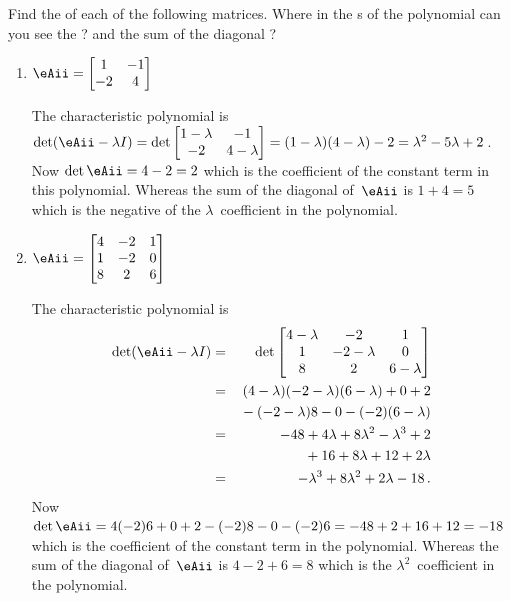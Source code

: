 \begin{example} \label{eg:}
Find the  of each of the following matrices.  
Where in the s of the polynomial can you see the ? and the sum of the diagonal ?
\begin{enumerate}
\item \(\eAii=\begin{bmatrix} 1&-1\\-2&4 \end{bmatrix}\)
\begin{solution} 
The characteristic polynomial is \(\det(\eAii-\lambda I)
=\det\begin{bmatrix} 1-\lambda&-1\\-2&4-\lambda \end{bmatrix}
=(1-\lambda)(4-\lambda)-2
=\lambda^2-5\lambda+2\)\,.
Now \(\det \eAii=4-2=2\) which is the coefficient of the constant term in this polynomial.
Whereas the sum of the diagonal of~\(\eAii\) is \(1+4=5\) which is the negative of the \(\lambda\)~coefficient in the polynomial.
\end{solution}

\item \(\eAii=\begin{bmatrix}4&-2&1
\\1&-2&0
\\8&2&6 \end{bmatrix}\)
\begin{solution} 
The characteristic polynomial is 
\begin{eqnarray*}
\det(\eAii-\lambda I)
&=&\det\begin{bmatrix} 4-\lambda&-2&1
\\1&-2-\lambda&0
\\8&2&6-\lambda \end{bmatrix}
\\&=&(4-\lambda)(-2-\lambda)(6-\lambda)+0+2
\\&&{}
-(-2-\lambda)8-0-(-2)(6-\lambda)
\\&=&-48+4\lambda+8\lambda^2-\lambda^3+2
\\&&{}
+16+8\lambda+12+2\lambda
\\&=&-\lambda^3+8\lambda^2+2\lambda-18\,.
\end{eqnarray*}
Now \(\det \eAii=4(-2)6+0+2-(-2)8-0-(-2)6=-48+2+16+12=-18\) which is the coefficient of the constant term in the polynomial.
Whereas the sum of the diagonal of~\(\eAii\) is \(4-2+6=8\) which is the \(\lambda^2\)~coefficient in the polynomial.
\end{solution}

\end{enumerate}
\end{example}




